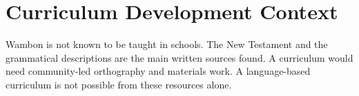 \documentclass[12pt]{article}
\begin{document}
\section{Curriculum Development Context}
Wambon is not known to be taught in schools. The New Testament and the grammatical descriptions are the main written sources found. A curriculum would need community-led orthography and materials work. A language-based curriculum is not possible from these resources alone.
\end{document}
